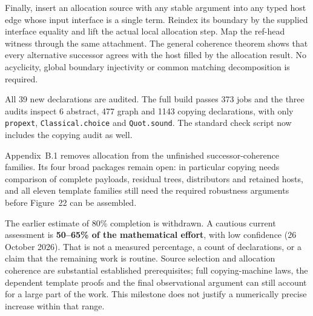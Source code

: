 

Finally, insert an allocation source with any stable argument into any
typed host edge whose input interface is a single term. Reindex its boundary
by the supplied interface equality and lift the actual local allocation step.
Map the ref-head witness through the same attachment. The general coherence
theorem shows that every alternative successor agrees with the host filled
by the allocation result. No acyclicity, global boundary injectivity or
common matching decomposition is required.


All 39 new declarations are audited. The full build passes 373 jobs and the
three audits inspect 6 abstract, 477 graph and 1143 copying declarations,
with only \texttt{propext}, \texttt{Classical.choice} and \texttt{Quot.sound}.
The standard check script now includes the copying audit as well.

Appendix~B.1 removes allocation from the unfinished successor-coherence
families. Its four broad packages remain open: in particular copying needs
comparison of complete payloads, residual trees, distributors and retained
hosts, and all eleven template families still need the required robustness
arguments before Figure~22 can be assembled.

The earlier estimate of 80\% completion is withdrawn. A cautious current
assessment is \textbf{50--65\% of the mathematical effort}, with low confidence
(26 October 2026). That is not a measured percentage, a count of declarations,
or a claim that the remaining work is routine. Source selection and allocation
coherence are substantial established prerequisites; full copying-machine laws,
the dependent template proofs and the final observational argument can still
account for a large part of the work. This milestone does not justify a
numerically precise increase within that range.


